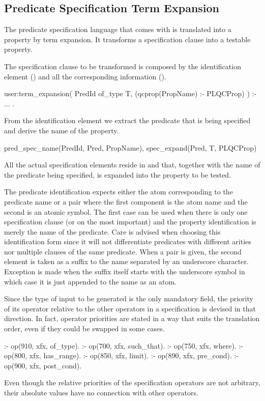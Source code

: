 \subsection{Predicate Specification Term Expansion}

The predicate specification language that comes with \plqc{} is
translated into a \plqc{} property by term expansion.
%
It transforms a specification clause into a testable property.


The specification clause to be transformed is composed by the
identification element () and all the corresponding
information ().
%
\begin{yapcode}
 user:term_expansion(
       PredId of_type T,
       (qcprop(PropName) :- PLQCProp) ) :-
   ...
 .
\end{yapcode}
%
From the identification element we extract the predicate that is being
specified and derive the name of the property.
%
\begin{yapcode}
   pred_spec_name(PredId, Pred, PropName),
   spec_expand(Pred, T, PLQCProp)
\end{yapcode}
%
All the actual specification elements reside in  and that,
together with the name of the predicate being specified, is expanded
into the property to be tested.


The predicate identification expects either the atom corresponding to
the predicate name or a pair where the first component is the atom name
and the second is an atomic symbol.
%
The first case can be used when there is only one specification clause
(or on the most important) and the property identification is merely the
name of the predicate.
%
Care is advised when choosing this identification form since it will not
differentiate predicates with different arities nor multiple clauses of
the same predicate.
%
When a pair is given, the second element is taken as a suffix to the
name separated by an underscore character.
%
Exception is made when the suffix itself starts with the underscore
symbol in which case it is just appended to the name as an atom.


Since the type of input to be generated is the only mandatory field, the
priority of its operator relative to the other operators in a
specification is devised in that direction.
%
In fact, operator priorities are stated in a way that suits the
translation order, even if they could be swapped in some cases.
%
\begin{yapcode}
 :- op(910, xfx, of_type).
 :- op(700, xfx, such_that).
 :- op(750, xfx, where).
 :- op(800, xfx, has_range).
 :- op(850, xfx, limit).
 :- op(890, xfx, pre_cond).
 :- op(900, xfx, post_cond).
\end{yapcode}
%
Even though the relative priorities of the specification operators are
not arbitrary, their absolute values have no connection with other
\Prolog{} operators.


